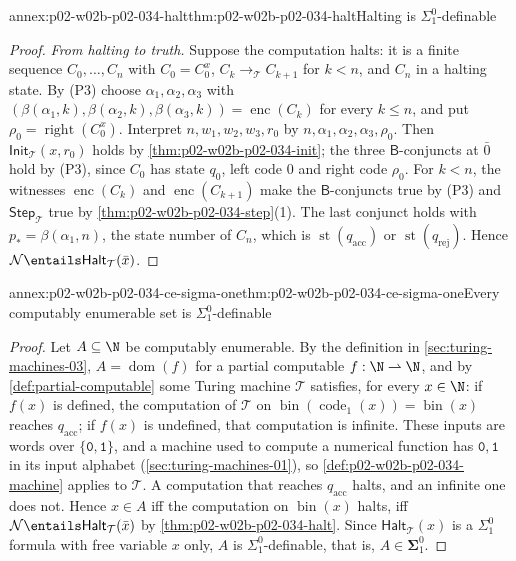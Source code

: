 \begin{annexitem}{annex:p02-w02b-p02-034-halt}{thm:p02-w02b-p02-034-halt}{Halting is \(\Sigma^0_1\)-definable}
\begin{proof}
\emph{From halting to truth.}  Suppose the computation halts: it is a finite
sequence \(C_0,\ldots,C_n\) with \(C_0=C^x_0\),
\(C_k\longrightarrow_{\mathcal T}C_{k+1}\) for \(k<n\), and \(C_n\) in a
halting state.  By (P3) choose \(\alpha_1,\alpha_2,\alpha_3\) with
\((\beta(\alpha_1,k),\beta(\alpha_2,k),\beta(\alpha_3,k))=\operatorname{enc}(C_k)\)
for every \(k\le n\), and put \(\rho_0=\operatorname{right}(C^x_0)\).
Interpret \(n,w_1,w_2,w_3,r_0\) by \(n,\alpha_1,\alpha_2,\alpha_3,\rho_0\).
Then \(\mathsf{Init}_{\mathcal T}(x,r_0)\) holds by
\cref{thm:p02-w02b-p02-034-init}; the three \(\mathsf B\)-conjuncts at
\(\bar0\) hold by (P3), since \(C_0\) has state \(q_0\), left code \(0\) and
right code \(\rho_0\).  For \(k<n\), the witnesses
\(\operatorname{enc}(C_k)\) and \(\operatorname{enc}(C_{k+1})\) make the
\(\mathsf B\)-conjuncts true by (P3) and \(\mathsf{Step}_{\mathcal T}\) true by
\cref{thm:p02-w02b-p02-034-step}(1).  The last conjunct holds with
\(p_\ast=\beta(\alpha_1,n)\), the state number of \(C_n\), which is
\(\operatorname{st}(q_{\mathrm{acc}})\) or \(\operatorname{st}(q_{\mathrm{rej}})\).
Hence \(\mathcal N\entails\mathsf{Halt}_{\mathcal T}(\bar x)\).
\end{proof}
\end{annexitem}

\begin{annexitem}{annex:p02-w02b-p02-034-ce-sigma-one}{thm:p02-w02b-p02-034-ce-sigma-one}{Every computably enumerable set is \(\Sigma^0_1\)-definable}
\begin{proof}
Let \(A\subseteq\N\) be computably enumerable.  By the definition in
\cref{sec:turing-machines-03}, \(A=\operatorname{dom}(f)\) for a partial
computable \(f:\N\rightharpoonup\N\), and by \cref{def:partial-computable}
some Turing machine \(\mathcal T\) satisfies, for every \(x\in\N\): if
\(f(x)\) is defined, the computation of \(\mathcal T\) on
\(\operatorname{bin}(\operatorname{code}_1(x))=\operatorname{bin}(x)\) reaches
\(q_{\mathrm{acc}}\); if \(f(x)\) is undefined, that computation is infinite.
These inputs are words over \(\{\mathtt 0,\mathtt 1\}\), and a machine used to
compute a numerical function has \(\mathtt 0,\mathtt 1\) in its input alphabet
(\cref{sec:turing-machines-01}), so \cref{def:p02-w02b-p02-034-machine}
applies to \(\mathcal T\).  A computation that reaches
\(q_{\mathrm{acc}}\) halts, and an infinite one does not.  Hence \(x\in A\)
iff the computation on \(\operatorname{bin}(x)\) halts, iff
\(\mathcal N\entails\mathsf{Halt}_{\mathcal T}(\bar x)\) by
\cref{thm:p02-w02b-p02-034-halt}.  Since \(\mathsf{Halt}_{\mathcal T}(x)\) is a
\(\Sigma^0_1\) formula with free variable \(x\) only, \(A\) is
\(\Sigma^0_1\)-definable, that is, \(A\in\boldsymbol\Sigma^0_1\).
\end{proof}
\end{annexitem}

